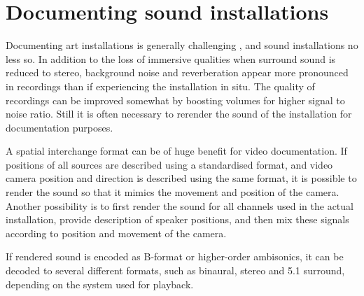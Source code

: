 \documentclass{article}
\begin{document}








\section{Documenting sound installations}\label{sec:documenting} %

Documenting art installations is generally challenging \cite{Bishop:2005installation}, and sound installations no less so. In addition to the loss of immersive qualities when surround sound is reduced to stereo, background noise and reverberation appear more pronounced in recordings than if experiencing the installation in situ. The quality of recordings can be improved somewhat by boosting volumes for higher signal to noise ratio. Still it is often necessary to rerender the sound of the installation for documentation purposes.

A spatial interchange format can be of huge benefit for video documentation. If positions of all sources are described using a standardised format, and video camera position and direction is described using the same format, it is possible to render the sound so that it mimics the movement and position of the camera. Another possibility is to first render the sound for all channels used in the actual installation, provide description of speaker positions, and then mix these signals according to position and movement of the camera.

If rendered sound is encoded as B-format or higher-order ambisonics, it can be decoded to several different formats, such as binaural, stereo and 5.1 surround, depending on the system used for playback.








\end{document}
